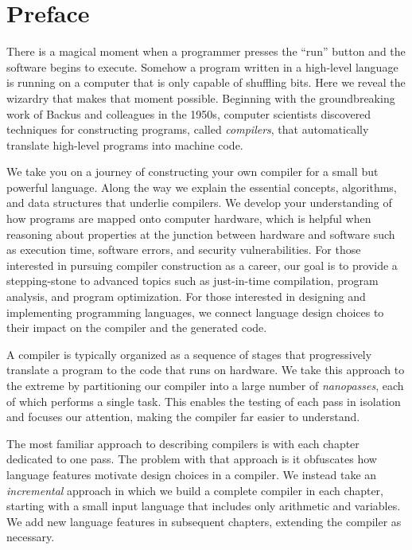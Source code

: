 \documentclass[7x10,nocrop]{TimesAPriori_MIT}%
\begin{document}

\tableofcontents



\chapter*{Preface}

There is a magical moment when a programmer presses the ``run'' button
and the software begins to execute. Somehow a program written in a
high-level language is running on a computer that is only capable of
shuffling bits. Here we reveal the wizardry that makes that moment
possible. Beginning with the groundbreaking work of Backus and
colleagues in the 1950s, computer scientists discovered techniques for
constructing programs, called \emph{compilers}, that automatically
translate high-level programs into machine code.

We take you on a journey of constructing your own compiler for a small
but powerful language. Along the way we explain the essential
concepts, algorithms, and data structures that underlie compilers. We
develop your understanding of how programs are mapped onto computer
hardware, which is helpful when reasoning about properties at the
junction between hardware and software such as execution time,
software errors, and security vulnerabilities.  For those interested
in pursuing compiler construction as a career, our goal is to provide a
stepping-stone to advanced topics such as just-in-time compilation,
program analysis, and program optimization.  For those interested in
designing and implementing programming languages, we connect
language design choices to their impact on the compiler and the generated
code.

A compiler is typically organized as a sequence of stages that
progressively translate a program to the code that runs on
hardware. We take this approach to the extreme by partitioning our
compiler into a large number of \emph{nanopasses}, each of which
performs a single task. This enables the testing of each pass in
isolation and focuses our attention, making the compiler far easier to
understand.

The most familiar approach to describing compilers is with each
chapter dedicated to one pass.  The problem with that approach is it
obfuscates how language features motivate design choices in a
compiler. We instead take an \emph{incremental} approach in which we
build a complete compiler in each chapter, starting with a small input
language that includes only arithmetic and variables. We add new
language features in subsequent chapters, extending the compiler as
necessary.
\end{document}
